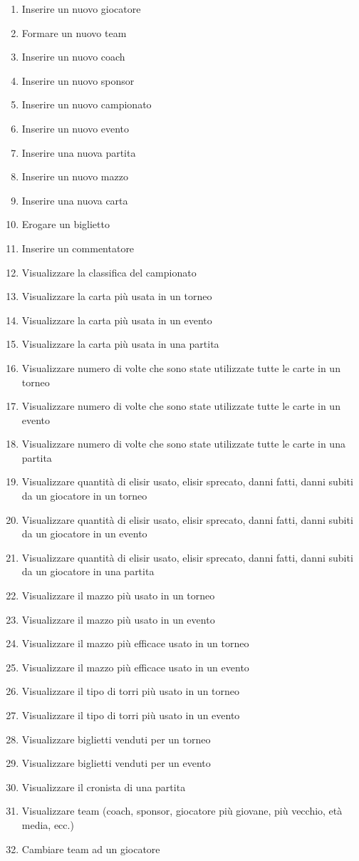\documentclass{article}
\begin{document}
\begin{enumerate}
    \item Inserire un nuovo giocatore
    \item Formare un nuovo team
    \item Inserire un nuovo coach
    \item Inserire un nuovo sponsor
    \item Inserire un nuovo campionato
    \item Inserire un nuovo evento
    \item Inserire una nuova partita
    \item Inserire un nuovo mazzo
    \item Inserire una nuova carta
    \item Erogare un biglietto
    \item Inserire un commentatore
    \item Visualizzare la classifica del campionato
    \item Visualizzare la carta più usata in un torneo
    \item Visualizzare la carta più usata in un evento
    \item Visualizzare la carta più usata in una partita
    \item Visualizzare numero di volte che sono state utilizzate tutte le carte in un torneo
    \item Visualizzare numero di volte che sono state utilizzate tutte le carte in un evento
    \item Visualizzare numero di volte che sono state utilizzate tutte le carte in una partita
    \item Visualizzare quantità di elisir usato, elisir sprecato, danni fatti, danni subiti da un giocatore in un torneo
    \item Visualizzare quantità di elisir usato, elisir sprecato, danni fatti, danni subiti da un giocatore in un evento
    \item Visualizzare quantità di elisir usato, elisir sprecato, danni fatti, danni subiti da un giocatore in una partita
    \item Visualizzare il mazzo più usato in un torneo
    \item Visualizzare il mazzo più usato in un evento
    \item Visualizzare il mazzo più efficace usato in un torneo
    \item Visualizzare il mazzo più efficace usato in un evento
    \item Visualizzare il tipo di torri più usato in un torneo
    \item Visualizzare il tipo di torri più usato in un evento
    \item Visualizzare biglietti venduti per un torneo 
    \item Visualizzare biglietti venduti per un evento  
    \item Visualizzare il cronista di una partita
    \item Visualizzare team (coach, sponsor, giocatore più giovane, più vecchio, età media, ecc.)
    \item Cambiare team ad un giocatore
    
\end{enumerate}
\end{document}
